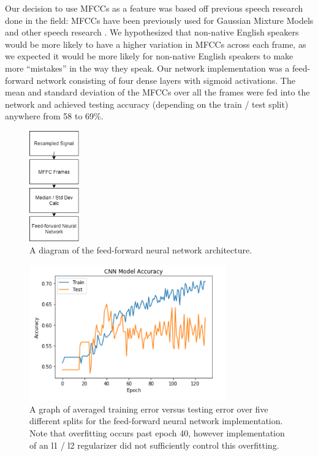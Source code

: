 \documentclass{article}
\begin{document}
Our decision to use MFCCs as a feature was based off previous speech research done in the field: MFCCs have been previously used for Gaussian Mixture Models and other speech research \cite{mfccs, chuaccent}.
We hypothesized that non-native English speakers would be more likely to have a higher variation in MFCCs across each frame, as we expected it would be more likely for non-native English speakers to make more “mistakes” in the way they speak.
Our network implementation was a feed-forward network consisting of four dense layers with sigmoid activations.
The mean and standard deviation of the MFCCs over all the frames were fed into the network and achieved testing accuracy (depending on the train / test split) anywhere from 58 to 69\%.

\begin{figure}[htb]
	\centering
	\includegraphics[width = 2.15cm]{figs/ff_architecture}
	\caption{A diagram of the feed-forward neural network architecture.}
	\label{fig:ff_architecture}
\end{figure}

\begin{figure}[htb]
	\centering
	\includegraphics[width = 8.5cm]{figs/ff_graph}
	\caption{A graph of averaged training error versus testing error over five different splits for the feed-forward neural network implementation. Note that overfitting occurs past epoch 40, however implementation of an  l1 / l2 regularizer did not sufficiently control this overfitting.}
	\label{fig:ff_graph}
\end{figure}
\end{document}
